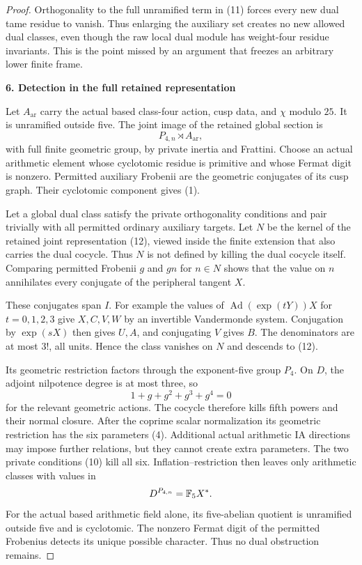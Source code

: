 \begin{proof}
Orthogonality to the full unramified term in (11) forces every new dual tame residue to vanish. Thus enlarging the auxiliary set creates no new allowed dual classes, even though the raw local dual module has weight-four residue invariants. This is the point missed by an argument that freezes an arbitrary lower finite frame.

\par\medskip\noindent\textbf{6. Detection in the full retained representation}\par\nobreak\smallskip
Let $A_{\mathrm{ar}}$ carry the actual based class-four action, cusp data, and $\chi$ modulo $25$. It is unramified outside five. The joint image of the retained global section is
\[
 P_{4,n}\rtimes A_{\mathrm{ar}},
 \tag{12}
\]
with full finite geometric group, by private inertia and Frattini. Choose an actual arithmetic element whose cyclotomic residue is primitive and whose Fermat digit is nonzero. Permitted auxiliary Frobenii are the geometric conjugates of its cusp graph. Their cyclotomic component gives (1).

Let a global dual class satisfy the private orthogonality conditions and pair trivially with all permitted ordinary auxiliary targets. Let $N$ be the kernel of the retained joint representation (12), viewed inside the finite extension that also carries the dual cocycle. Thus $N$ is not defined by killing the dual cocycle itself. Comparing permitted Frobenii $g$ and $gn$ for $n\in N$ shows that the value on $n$ annihilates every conjugate of the peripheral tangent $X$.

These conjugates span $I$. For example the values of $\operatorname{Ad}(\exp(tY))X$ for $t=0,1,2,3$ give $X,C,V,W$ by an invertible Vandermonde system. Conjugation by $\exp(sX)$ then gives $U,A$, and conjugating $V$ gives $B$. The denominators are at most $3!$, all units. Hence the class vanishes on $N$ and descends to (12).

Its geometric restriction factors through the exponent-five group $P_4$. On $D$, the adjoint nilpotence degree is at most three, so
\[
 1+g+g^2+g^3+g^4=0
\]
for the relevant geometric actions. The cocycle therefore kills fifth powers and their normal closure. After the coprime scalar normalization its geometric restriction has the six parameters (4). Additional actual arithmetic IA directions may impose further relations, but they cannot create extra parameters. The two private conditions (10) kill all six. Inflation--restriction then leaves only arithmetic classes with values in
\[
 D^{P_{4,n}}=\mathbb F_5X^*.
\]
For the actual based arithmetic field alone, its five-abelian quotient is unramified outside five and is cyclotomic. The nonzero Fermat digit of the permitted Frobenius detects its unique possible character. Thus no dual obstruction remains.


\end{proof}
